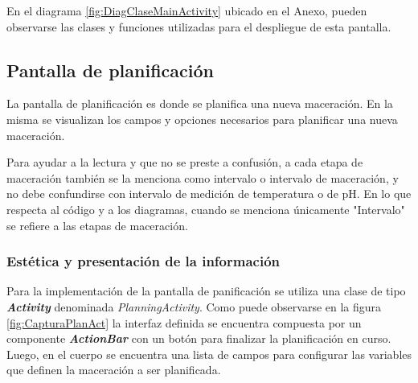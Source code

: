                 \par En el diagrama \ref{fig:DiagClaseMainActivity} ubicado en el Anexo, pueden observarse las clases y funciones utilizadas para el despliegue de esta pantalla.
                
                
        \subsection{Pantalla de planificación}
        \label{DescripPantallaPlanificación}
            \par La pantalla de planificación es donde se planifica una nueva maceración. En la misma se visualizan los campos y opciones necesarios para planificar una nueva maceración. 
            \par Para ayudar a la lectura y que no se preste a confusión, a cada etapa de maceración también se la menciona como intervalo o intervalo de maceración, y no debe confundirse con intervalo de medición de temperatura o de pH. En lo que respecta al código y a los diagramas, cuando se menciona únicamente "Intervalo" se refiere a las etapas de maceración.
        
        \subsubsection{Estética y presentación de la información}
                \par Para la implementación de la pantalla de panificación se utiliza una clase de tipo \textbf{\textit{\gls{Activity}}} denominada \textit{PlanningActivity}. Como puede observarse en la figura \ref{fig:CapturaPlanAct} la interfaz definida se encuentra compuesta por un componente \textbf{\textit{\gls{ActionBar}}} con un botón para finalizar la planificación en curso. Luego, en el cuerpo se encuentra una lista de campos para configurar las variables que definen la maceración a ser planificada.
                

